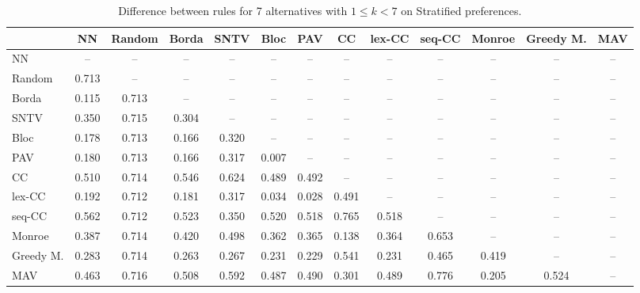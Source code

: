 
\begin{table*}[htbp]
\centering
\begin{tabular}{lcccccccccccc}
\toprule
 & NN & Random & Borda & SNTV & Bloc & PAV & CC & lex-CC & seq-CC & Monroe & Greedy M. & MAV \\
\midrule
NN & -- & -- & -- & -- & -- & -- & -- & -- & -- & -- & -- & -- \\
Random & \cellcolor{blue!71} 0.713 & -- & -- & -- & -- & -- & -- & -- & -- & -- & -- & -- \\
Borda & \cellcolor{blue!11} 0.115 & \cellcolor{blue!71} 0.713 & -- & -- & -- & -- & -- & -- & -- & -- & -- & -- \\
SNTV & \cellcolor{blue!35} 0.350 & \cellcolor{blue!71} 0.715 & \cellcolor{blue!30} 0.304 & -- & -- & -- & -- & -- & -- & -- & -- & -- \\
Bloc & \cellcolor{blue!17} 0.178 & \cellcolor{blue!71} 0.713 & \cellcolor{blue!16} 0.166 & \cellcolor{blue!32} 0.320 & -- & -- & -- & -- & -- & -- & -- & -- \\
PAV & \cellcolor{blue!18} 0.180 & \cellcolor{blue!71} 0.713 & \cellcolor{blue!16} 0.166 & \cellcolor{blue!31} 0.317 & \cellcolor{blue!0} 0.007 & -- & -- & -- & -- & -- & -- & -- \\
CC & \cellcolor{blue!51} 0.510 & \cellcolor{blue!71} 0.714 & \cellcolor{blue!54} 0.546 & \cellcolor{blue!62} 0.624 & \cellcolor{blue!48} 0.489 & \cellcolor{blue!49} 0.492 & -- & -- & -- & -- & -- & -- \\
lex-CC & \cellcolor{blue!19} 0.192 & \cellcolor{blue!71} 0.712 & \cellcolor{blue!18} 0.181 & \cellcolor{blue!31} 0.317 & \cellcolor{blue!3} 0.034 & \cellcolor{blue!2} 0.028 & \cellcolor{blue!49} 0.491 & -- & -- & -- & -- & -- \\
seq-CC & \cellcolor{blue!56} 0.562 & \cellcolor{blue!71} 0.712 & \cellcolor{blue!52} 0.523 & \cellcolor{blue!35} 0.350 & \cellcolor{blue!52} 0.520 & \cellcolor{blue!51} 0.518 & \cellcolor{blue!76} 0.765 & \cellcolor{blue!51} 0.518 & -- & -- & -- & -- \\
Monroe & \cellcolor{blue!38} 0.387 & \cellcolor{blue!71} 0.714 & \cellcolor{blue!42} 0.420 & \cellcolor{blue!49} 0.498 & \cellcolor{blue!36} 0.362 & \cellcolor{blue!36} 0.365 & \cellcolor{blue!13} 0.138 & \cellcolor{blue!36} 0.364 & \cellcolor{blue!65} 0.653 & -- & -- & -- \\
Greedy M. & \cellcolor{blue!28} 0.283 & \cellcolor{blue!71} 0.714 & \cellcolor{blue!26} 0.263 & \cellcolor{blue!26} 0.267 & \cellcolor{blue!23} 0.231 & \cellcolor{blue!22} 0.229 & \cellcolor{blue!54} 0.541 & \cellcolor{blue!23} 0.231 & \cellcolor{blue!46} 0.465 & \cellcolor{blue!41} 0.419 & -- & -- \\
MAV & \cellcolor{blue!46} 0.463 & \cellcolor{blue!71} 0.716 & \cellcolor{blue!50} 0.508 & \cellcolor{blue!59} 0.592 & \cellcolor{blue!48} 0.487 & \cellcolor{blue!49} 0.490 & \cellcolor{blue!30} 0.301 & \cellcolor{blue!48} 0.489 & \cellcolor{blue!77} 0.776 & \cellcolor{blue!20} 0.205 & \cellcolor{blue!52} 0.524 & -- \\
\bottomrule
\end{tabular}

\caption{Difference between rules for 7 alternatives with $1 \leq k < 7$ on Stratified preferences.}
\label{tab:rule_distance_heatmap-m=[7]-pref_dist=stratification__args__weight=0.5}
\end{table*}
    